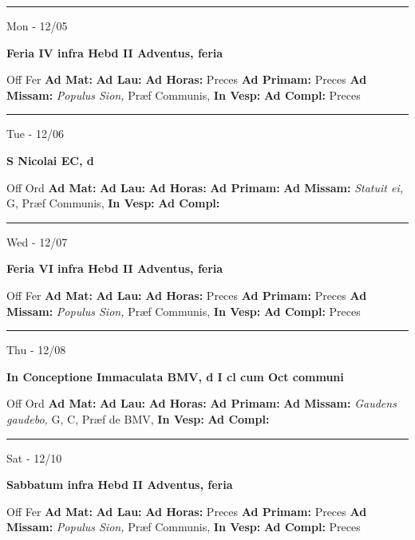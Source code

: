 \documentclass[letterpaper, 10pt]{article}
\begin{document}
\hrule
\begin{center}
Mon - 12/05
\end{center}\textbf{ \large Feria IV infra Hebd II Adventus, \textnormal{\normalsize feria}}
\begin{justify}
Off Fer
\textbf{Ad Mat: }
\textbf{Ad Lau: }
\textbf{Ad Horas: }Preces
\textbf{Ad Primam: }Preces
\textbf{Ad Missam:} \textit{Populus Sion, } Præf Communis, 
\textbf{In Vesp: }
\textbf{Ad Compl: }Preces\end{justify}



\hrule
\begin{center}
Tue - 12/06
\end{center}\textbf{ \large S Nicolai EC, \textnormal{\normalsize d}}
\begin{justify}
Off Ord
\textbf{Ad Mat: }
\textbf{Ad Lau: }
\textbf{Ad Horas: }
\textbf{Ad Primam: }
\textbf{Ad Missam:} \textit{Statuit ei, } G, Præf Communis, 
\textbf{In Vesp: }
\textbf{Ad Compl: }\end{justify}



\hrule
\begin{center}
Wed - 12/07
\end{center}\textbf{ \large Feria VI infra Hebd II Adventus, \textnormal{\normalsize feria}}
\begin{justify}
Off Fer
\textbf{Ad Mat: }
\textbf{Ad Lau: }
\textbf{Ad Horas: }Preces
\textbf{Ad Primam: }Preces
\textbf{Ad Missam:} \textit{Populus Sion, } Præf Communis, 
\textbf{In Vesp: }
\textbf{Ad Compl: }Preces\end{justify}



\hrule
\begin{center}
Thu - 12/08
\end{center}\textbf{ \large In Conceptione Immaculata BMV, \textnormal{\normalsize d I cl cum Oct communi}}
\begin{justify}
Off Ord
\textbf{Ad Mat: }
\textbf{Ad Lau: }
\textbf{Ad Horas: }
\textbf{Ad Primam: }
\textbf{Ad Missam:} \textit{Gaudens gaudebo, } G, C, Præf de BMV, 
\textbf{In Vesp: }
\textbf{Ad Compl: }\end{justify}



\hrule
\begin{center}
Sat - 12/10
\end{center}\textbf{ \large Sabbatum infra Hebd II Adventus, \textnormal{\normalsize feria}}
\begin{justify}
Off Fer
\textbf{Ad Mat: }
\textbf{Ad Lau: }
\textbf{Ad Horas: }Preces
\textbf{Ad Primam: }Preces
\textbf{Ad Missam:} \textit{Populus Sion, } Præf Communis, 
\textbf{In Vesp: }
\textbf{Ad Compl: }Preces\end{justify}
\end{document}

